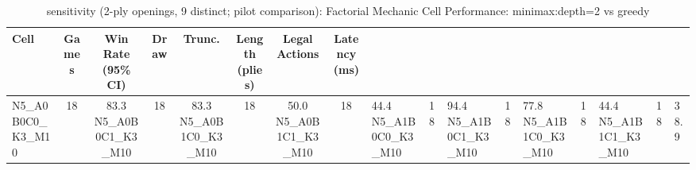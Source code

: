 \begin{table}[htbp]
\centering
\caption{sensitivity (2-ply openings, 9 distinct; pilot comparison): Factorial Mechanic Cell Performance: minimax:depth=2 vs greedy}
\label{tab:ablation_cells}
\begin{tabular}{lccccccc}
\toprule
Cell & Games & Win Rate (95\% CI) & Draw & Trunc. & Length (plies) & Legal Actions & Latency (ms) \\
\midrule
N5\_A0B0C0\_K3\_M10 & 18 & 83.3%
N5\_A0B0C1\_K3\_M10 & 18 & 83.3%
N5\_A0B1C0\_K3\_M10 & 18 & 50.0%
N5\_A0B1C1\_K3\_M10 & 18 & 44.4%
N5\_A1B0C0\_K3\_M10 & 18 & 94.4%
N5\_A1B0C1\_K3\_M10 & 18 & 77.8%
N5\_A1B1C0\_K3\_M10 & 18 & 44.4%
N5\_A1B1C1\_K3\_M10 & 18 & 38.9%
\bottomrule
\end{tabular}
\end{table}
